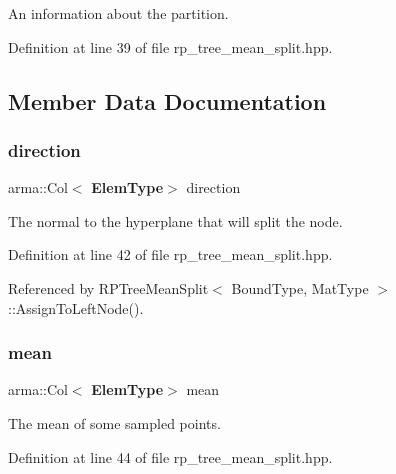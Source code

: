 An information about the partition. 

Definition at line 39 of file rp\+\_\+tree\+\_\+mean\+\_\+split.\+hpp.



\subsection{Member Data Documentation}
\mbox{\label{structmlpack_1_1tree_1_1RPTreeMeanSplit_1_1SplitInfo_a620f4f39e225b65a841f34c53b94515f}} 
\subsubsection{direction}
{\footnotesize\ttfamily arma\+::\+Col$<$\textbf{ Elem\+Type}$>$ direction}



The normal to the hyperplane that will split the node. 



Definition at line 42 of file rp\+\_\+tree\+\_\+mean\+\_\+split.\+hpp.



Referenced by R\+P\+Tree\+Mean\+Split$<$ Bound\+Type, Mat\+Type $>$\+::\+Assign\+To\+Left\+Node().

\mbox{\label{structmlpack_1_1tree_1_1RPTreeMeanSplit_1_1SplitInfo_a12759ca9cb67acd78d9f84691d3dbca2}} 
\subsubsection{mean}
{\footnotesize\ttfamily arma\+::\+Col$<$\textbf{ Elem\+Type}$>$ mean}



The mean of some sampled points. 



Definition at line 44 of file rp\+\_\+tree\+\_\+mean\+\_\+split.\+hpp.



